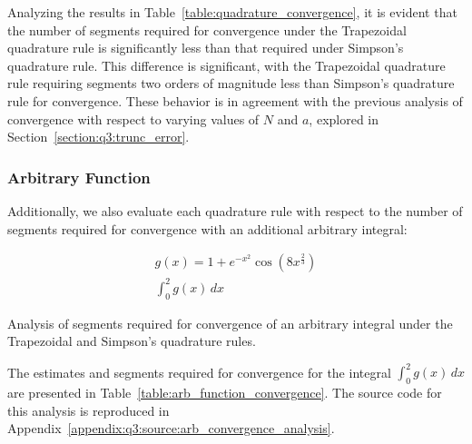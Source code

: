 \documentclass[10pt]{article}
\begin{document}
    Analyzing the results in Table~\ref{table:quadrature_convergence}, it is evident that the number of segments required for convergence under the Trapezoidal quadrature rule is significantly less than that required under Simpson's quadrature rule. This difference is significant, with the Trapezoidal quadrature rule requiring segments two orders of magnitude less than Simpson's quadrature rule for convergence. These behavior is in agreement with the previous analysis of convergence with respect to varying values of $N$ and $a$, explored in Section~\ref{section:q3:trunc_error}.

        \subsubsection{Arbitrary Function}

        Additionally, we also evaluate each quadrature rule with respect to the number of segments required for convergence with an additional arbitrary integral:
        
        \begin{gather*}
            g(x) = 1 + e^{-x^{2}} \cos{(8x^{\frac{2}{3}})} \\
            \int_0^2 g(x) \, dx
        \end{gather*}

        \begin{table}[h]
            \centering
            \caption{Analysis of segments required for convergence of an arbitrary integral under the Trapezoidal and Simpson's quadrature rules.}
            \label{table:arb_function_convergence}
        \end{table}

        The estimates and segments required for convergence for the integral $\int_0^2 g(x) \, dx$ are presented in Table~\ref{table:arb_function_convergence}. The source code for this analysis is reproduced in Appendix~\ref{appendix:q3:source:arb_convergence_analysis}.




\newpage

\printbibliography



\newpage

\appendix %
\end{document}
